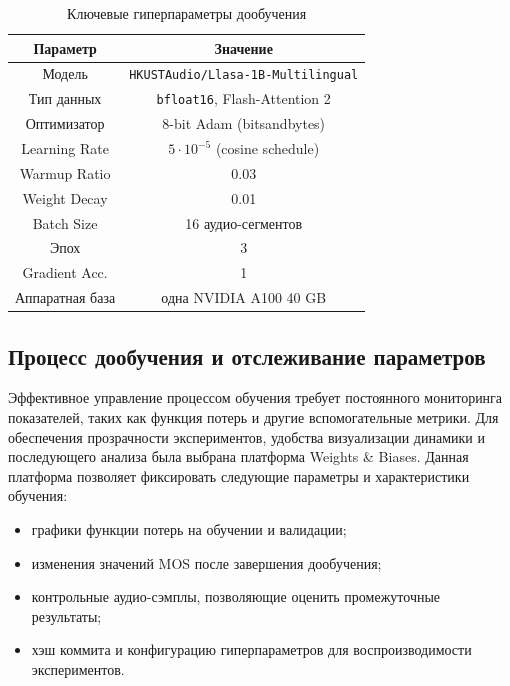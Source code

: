 \begin{table}[h!]
\centering
  \caption{Ключевые гиперпараметры дообучения}
  \begin{tabular}{|c|c|}
    \hline
    Параметр & Значение \\
    \hline
    Модель & \texttt{HKUSTAudio/Llasa-1B-Multilingual} \\
    \hline
    Тип данных & \texttt{bfloat16}, Flash-Attention 2 \\
    \hline
    Оптимизатор & 8-bit Adam (bitsandbytes) \\
    \hline
    Learning Rate & $5\!\cdot\!10^{-5}$ (cosine schedule) \\
    \hline
    Warmup Ratio & 0.03 \\
    \hline
    Weight Decay & 0.01 \\
    \hline
    Batch Size & 16 аудио-сегментов \\
    \hline
    Эпох & 3 \\
    \hline
    Gradient Acc. & 1 \\
    \hline
    Аппаратная база & одна NVIDIA A100 40 GB \\ 
    \hline
  \end{tabular}
  \label{tab:ft_hparams}
\end{table}

\subsection{Процесс дообучения и отслеживание параметров}

Эффективное управление процессом обучения требует постоянного мониторинга показателей, таких как  
функция потерь и другие вспомогательные метрики. Для обеспечения прозрачности экспериментов,  
удобства визуализации динамики и последующего анализа была выбрана платформа Weights \& Biases.  
Данная платформа позволяет фиксировать следующие параметры и характеристики обучения:

\begin{itemize}
  \item графики функции потерь на обучении и валидации;  
  \item изменения значений MOS после завершения дообучения;  
  \item контрольные аудио-сэмплы, позволяющие оценить промежуточные результаты;  
  \item хэш коммита и конфигурацию гиперпараметров для воспроизводимости экспериментов.  
\end{itemize}

